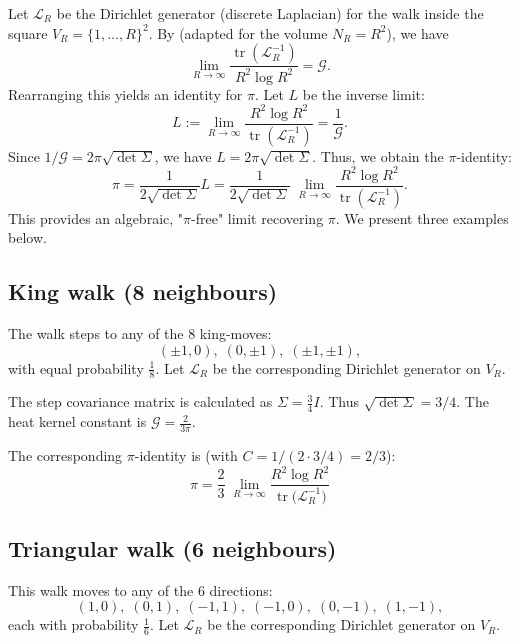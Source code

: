 \documentclass[12pt]{amsart}
\theoremstyle{definition}
\theoremstyle{remark}
\newcommand{\cG}{\mathcal{G}}    %
\DeclareMathOperator{\tr}{tr}    %
\begin{document}
Let \( \mathcal{L}_R \) be the Dirichlet generator
(discrete Laplacian) for the walk inside the square \( V_R = \{1,\dots,R\}^2 \).
By  (adapted for the volume $N_R=R^2$), we have
\[
\lim_{R\to\infty} \frac{\tr(\mathcal{L}_R^{-1})}{R^2 \log R^2} = \cG.
\]
Rearranging this yields an identity for $\pi$. Let $L$ be the inverse limit:
\[
L := \lim_{R\to\infty}\frac{R^{2}\log R^{2}}
                        {\tr(\mathcal{L}_R^{-1})} = \frac{1}{\cG}.
\]
Since $1/\cG = 2\pi\sqrt{\det\Sigma}$, we have $L = 2\pi\sqrt{\det\Sigma}$. Thus, we obtain the $\pi$-identity:
\[
\pi = \frac{1}{2\sqrt{\det\Sigma}} L = \frac{1}{2\sqrt{\det\Sigma}}\;
      \lim_{R\to\infty}\frac{R^{2}\log R^{2}}
                        {\tr(\mathcal{L}_R^{-1})}.
\]
This provides an algebraic, "$\pi$-free" limit recovering $\pi$. We present three examples below.

\subsection{King walk (8 neighbours)}\label{app:king}

The walk steps to any of the 8 king-moves:
\[
(\pm1,0),\;(0,\pm1),\;(\pm1,\pm1),
\]
with equal probability \( \tfrac18 \). Let $\mathcal{L}_R$ be the corresponding Dirichlet generator on $V_R$.

The step covariance matrix is calculated as $\Sigma = \tfrac{3}{4} I$. Thus $\sqrt{\det\Sigma} = 3/4$.
The heat kernel constant is \( \cG = \frac{2}{3\pi} \).

The corresponding $\pi$-identity is (with $C = 1/(2 \cdot 3/4) = 2/3$):
\begin{equation}\label{eq:King_pi}
\boxed{\;
\displaystyle
\pi
=\frac{2}{3}\;
   \lim_{R\to\infty}
          \frac{R^{2}\log R^{2}}
               {\tr\!\bigl(\mathcal{L}_R^{-1}\bigr)}
   \;}
\end{equation}

\subsection{Triangular walk (6 neighbours)}\label{app:tri}

This walk moves to any of the 6 directions:
\[
(1,0),\;(0,1),\;(-1,1),\;(-1,0),\;(0,-1),\;(1,-1),
\]
each with probability \( \tfrac16 \). Let $\mathcal{L}_R$ be the corresponding Dirichlet generator on $V_R$.
\end{document}

